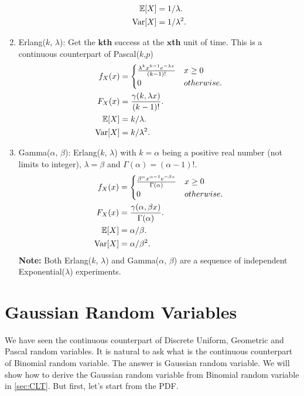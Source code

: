 \begin{enumerate}
{\begin{align*}
            \E{X}
            &= 1/\lambda. \\
            \Var[X]
            &= 1/\lambda^2.
        \end{align*}
    }
    \item Erlang($k$, $\lambda$): Get the $\bm{k}$\textbf{th} success at the $\bm{x}$\textbf{th} unit of time. This is a continuous counterpart of  Pascal($k$,$p$){
        \begin{align*}
            f_X(x)
            &= {
                \begin{cases}
                    \frac{\lambda^kx^{k-1}e^{-\lambda x}}{(k-1)!} & x\geq 0 \\
                    0      & otherwise.
                \end{cases}
            } \\
            F_X(x)
            &= \frac{\gamma(k, \lambda x)}{(k-1)!}. \\
            \E{X}
            &= k/\lambda. \\
            \Var[X]
            &= k/\lambda^2.
        \end{align*}
    }
    \item Gamma($\alpha$, $\beta$): Erlang($k$, $\lambda$) with $k=\alpha$ being a positive real number (not limits to integer), $\lambda=\beta$ and $\Gamma(\alpha)=(\alpha-1)!$. {
        \begin{align*}
            f_X(x)
            &= {
                \begin{cases}
                    \frac{\beta^{\alpha}x^{\alpha-1}e^{-\beta x}}{\Gamma(\alpha)} & x\geq 0 \\
                    0      & otherwise.
                \end{cases}
            } \\
            F_X(x)
            &= \frac{\gamma(\alpha,\beta x)}{\Gamma(\alpha)}. \\
            \E{X}
            &= \alpha/\beta. \\
            \Var[X]
            &= \alpha/\beta^2.
        \end{align*}
        \textbf{Note:} Both Erlang($k$, $\lambda$) and Gamma($\alpha$, $\beta$) are a sequence of independent Exponential($\lambda$) experiments.
    }
\end{enumerate}


\section{Gaussian Random Variables}
We have seen the continuous counterpart of Discrete Uniform, Geometric and Pascal random variables. It is natural to ask what is the continuous counterpart of Binomial random variable. The answer is Gaussian random variable. We will show how to derive the Gaussian random variable from Binomial random variable in \cref{sec:CLT}. But first, let's start from the \textnormal{PDF}.

